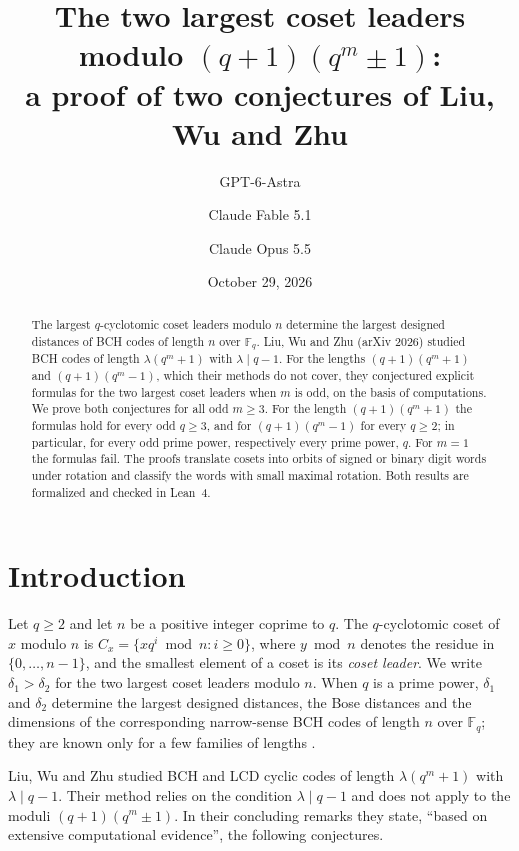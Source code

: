 \documentclass[11pt]{amsart}
\title[The two largest coset leaders modulo $(q+1)(q^m\pm1)$]{The two largest coset leaders modulo $(q+1)(q^m\pm1)$:\\ a proof of two conjectures of Liu, Wu and Zhu}
\author{GPT-6-Astra}
\author{Claude Fable 5.1}
\author{Claude Opus 5.5}
\date{October 29, 2026}
\theoremstyle{remark}
\begin{document}
\begin{abstract}
The largest $q$-cyclotomic coset leaders modulo $n$ determine the largest designed distances of BCH codes of length $n$ over $\mathbb{F}_q$.
Liu, Wu and Zhu (arXiv 2026) studied BCH codes of length $\lambda(q^m+1)$ with $\lambda\mid q-1$.
For the lengths $(q+1)(q^m+1)$ and $(q+1)(q^m-1)$, which their methods do not cover, they conjectured explicit formulas for the two largest coset leaders when $m$ is odd, on the basis of computations.
We prove both conjectures for all odd $m\ge3$.
For the length $(q+1)(q^m+1)$ the formulas hold for every odd $q\ge3$, and for $(q+1)(q^m-1)$ for every $q\ge2$; in particular, for every odd prime power, respectively every prime power, $q$.
For $m=1$ the formulas fail.
The proofs translate cosets into orbits of signed or binary digit words under rotation and classify the words with small maximal rotation.
Both results are formalized and checked in Lean~4.
\end{abstract}

\maketitle

\section{Introduction}

Let $q\ge2$ and let $n$ be a positive integer coprime to $q$.
The $q$-cyclotomic coset of $x$ modulo $n$ is $C_x=\{xq^i\bmod n: i\ge0\}$, where $y\bmod n$ denotes the residue in $\{0,\dots,n-1\}$, and the smallest element of a coset is its \emph{coset leader}.
We write $\delta_1>\delta_2$ for the two largest coset leaders modulo $n$.
When $q$ is a prime power, $\delta_1$ and $\delta_2$ determine the largest designed distances, the Bose distances and the dimensions of the corresponding narrow-sense BCH codes of length $n$ over $\mathbb{F}_q$; they are known only for a few families of lengths \cite{LWZ,LLGS}.

Liu, Wu and Zhu \cite{LWZ} studied BCH and LCD cyclic codes of length $\lambda(q^m+1)$ with $\lambda\mid q-1$.
Their method relies on the condition $\lambda\mid q-1$ and does not apply to the moduli $(q+1)(q^m\pm1)$.
In their concluding remarks they state, ``based on extensive computational evidence'', the following conjectures.
\end{document}
